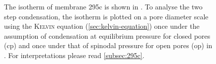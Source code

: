 \documentclass[../../../thesis.tex]{subfiles}
\begin{document}
\begin{figure}[tb]
{
        \label{fig:295c-op-cp}
      }
      \caption{The isotherm of membrane 295c is shown in \protect{}. To analyse the two step condensation, the isotherm is plotted on a pore diameter scale using the \textsc{Kelvin} equation (\cref{sec:kelvin-equation}) once under the assumption of condensation at equilibrium pressure for closed pores (cp) and once under that of spinodal pressure for open pores (op) in \protect{}. For interpretations please read \cref{subsec:295c}.}
      \label{fig:295c-analysis}
  \end{figure}
\end{document}
